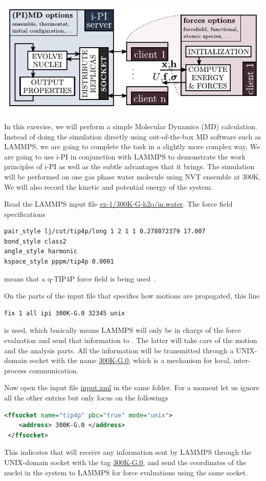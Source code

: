 \documentclass{article}
\begin{document}
\begin{Exercise}[label={basic},title={Molecular Dynamics simulations doing in a different way:  server and clients}]
\includegraphics[width=1.0\textwidth]{ipi-scheme.pdf}

In this exercise, we will perform a simple Molecular Dynamics (MD) calculation.
Instead of doing the simulation directly using out-of-the-box MD software such as LAMMPS,
we are going to complete the task in a slightly more complex way.
We are going to use i-PI in conjunction with LAMMPS to demonstrate the work principles of i-PI 
as well as the subtle advantages that it brings.
The simulation will be performed on one gas phase water molecule using NVT ensemble at 300K.
We will also record the kinetic and potential energy of the system.

\Question
Read the LAMMPS input file \url{ex-1/300K-G-h2o/in.water}.
The force field specifications
\begin{lstlisting}[language=bash]
pair_style lj/cut/tip4p/long 1 2 1 1 0.278072379 17.007
bond_style class2 
angle_style harmonic
kspace_style pppm/tip4p 0.0001
\end{lstlisting}
means that a q-TIP4P force field is being used~\cite{habe-mano11pccp}.

On the parts of the input file that specifies how motions are propagated,
this line
\begin{lstlisting}[language=bash]
fix 1 all ipi 300K-G.0 32345 unix
\end{lstlisting}
is used, which basically means LAMMPS will only be in charge of the force evaluation and send that information to \ipi{}.
The latter will take care of the motion and the analysis parts.
All the information will be transmitted through a UNIX-domain socket with the name \url{300K-G.0},
which is a mechanism for local, inter-process communication.

\Question
Now open the \ipi{} input file \url{input.xml} in the same folder.
For a moment let us ignore all the other entries but only focus on the followings
\begin{lstlisting}[language=xml]
 <ffsocket name="tip4p" pbc="true" mode="unix">
    <address> 300K-G.0 </address>
 </ffsocket>
\end{lstlisting}
This indicates that \ipi{} will receive any information sent by LAMMPS through the UNIX-domain socket with the tag \url{300K-G.0},
and send the coordinates of the nuclei in the system to LAMMPS for force evaluations using the same socket.


\end{Exercise}
\end{document}

